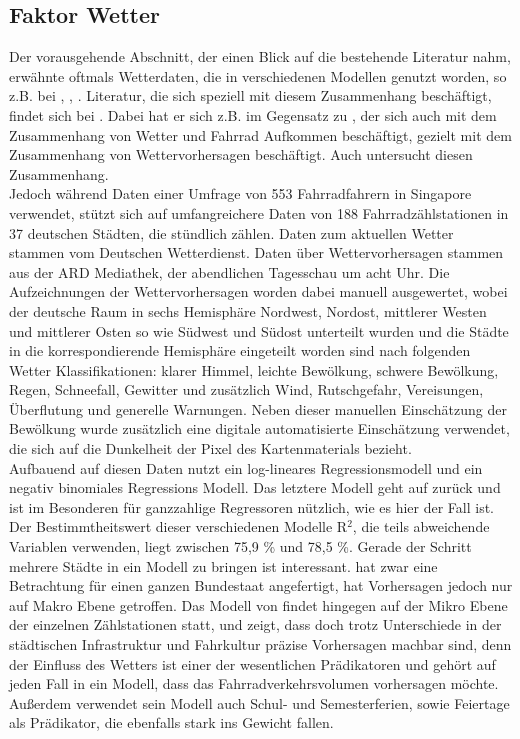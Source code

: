 \documentclass[a4paper,12pt]{thesis}
\begin{document}
\subsection{Faktor Wetter}

Der vorausgehende Abschnitt, der einen Blick auf die bestehende Literatur nahm, erwähnte oftmals Wetterdaten, die in verschiedenen Modellen genutzt worden, so z.B. bei \cite{Holmgren2017}, \cite{Broucke2019}, \cite{Li2015}. Literatur, die sich speziell mit diesem Zusammenhang beschäftigt, findet sich bei \cite{Wessel2020}. Dabei hat er sich z.B. im Gegensatz zu \cite{Nankervis1999}, der sich auch mit dem Zusammenhang von Wetter und Fahrrad Aufkommen beschäftigt, gezielt mit dem Zusammenhang von Wettervorhersagen beschäftigt. Auch \cite{Meng2016} untersucht diesen Zusammenhang.\\
Jedoch während \cite{Meng2016} Daten einer Umfrage von 553 Fahrradfahrern in Singapore verwendet, stützt sich \cite{Wessel2020} auf umfangreichere Daten von 188 Fahrradzählstationen in 37 deutschen Städten, die stündlich zählen. Daten zum aktuellen Wetter stammen vom Deutschen Wetterdienst. Daten über Wettervorhersagen stammen aus der ARD Mediathek, der abendlichen Tagesschau um acht Uhr. Die Aufzeichnungen der Wettervorhersagen worden dabei manuell ausgewertet, wobei der deutsche Raum in sechs Hemisphäre Nordwest, Nordost, mittlerer Westen und mittlerer Osten so wie Südwest und Südost unterteilt wurden und die Städte in die korrespondierende Hemisphäre eingeteilt worden sind nach folgenden Wetter Klassifikationen: klarer Himmel, leichte Bewölkung, schwere Bewölkung, Regen, Schneefall, Gewitter und zusätzlich Wind, Rutschgefahr, Vereisungen, Überflutung und generelle Warnungen. Neben dieser manuellen Einschätzung der Bewölkung wurde zusätzlich eine digitale automatisierte Einschätzung verwendet, die sich auf die Dunkelheit der Pixel des Kartenmaterials bezieht.\\
Aufbauend auf diesen Daten nutzt \cite{Wessel2020} ein log-lineares Regressionsmodell und ein negativ binomiales Regressions Modell. Das letztere Modell geht auf \cite{Hausman1984} zurück und ist im Besonderen für ganzzahlige Regressoren nützlich, wie es hier der Fall ist. Der Bestimmtheitswert dieser verschiedenen Modelle R$^2$, die teils abweichende Variablen verwenden, liegt zwischen 75,9 \% und 78,5 \%. Gerade der Schritt mehrere Städte in ein Modell zu bringen ist interessant. \cite{Saha2018} hat zwar eine Betrachtung für einen ganzen Bundestaat angefertigt, hat Vorhersagen jedoch nur auf Makro Ebene getroffen. Das Modell von \cite{Wessel2020} findet hingegen auf der Mikro Ebene der einzelnen Zählstationen statt, und zeigt, dass doch trotz Unterschiede in der städtischen Infrastruktur und Fahrkultur präzise Vorhersagen machbar sind, denn der Einfluss des Wetters ist einer der wesentlichen Prädikatoren und gehört auf jeden Fall in ein Modell, dass das Fahrradverkehrsvolumen vorhersagen möchte. Außerdem verwendet sein Modell auch Schul- und Semesterferien, sowie Feiertage als Prädikator, die ebenfalls stark ins Gewicht fallen.\\
\end{document}
